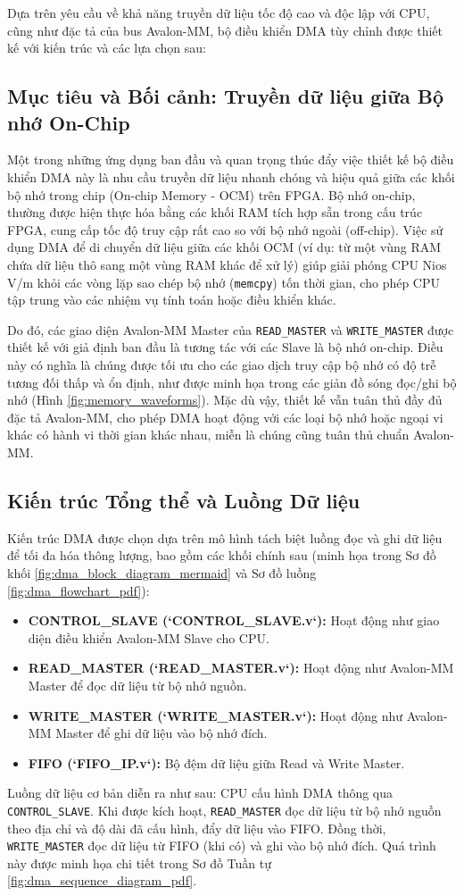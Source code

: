 Dựa trên yêu cầu về khả năng truyền dữ liệu tốc độ cao và độc lập với CPU, cũng như đặc tả của bus Avalon-MM, bộ điều khiển DMA tùy chỉnh được thiết kế với kiến trúc và các lựa chọn sau:

\subsection{Mục tiêu và Bối cảnh: Truyền dữ liệu giữa Bộ nhớ On-Chip}
\label{subsec:dma_context_onchip}
Một trong những ứng dụng ban đầu và quan trọng thúc đẩy việc thiết kế bộ điều khiển DMA này là nhu cầu truyền dữ liệu nhanh chóng và hiệu quả giữa các khối bộ nhớ trong chip (On-chip Memory - OCM) trên FPGA. Bộ nhớ on-chip, thường được hiện thực hóa bằng các khối RAM tích hợp sẵn trong cấu trúc FPGA, cung cấp tốc độ truy cập rất cao so với bộ nhớ ngoài (off-chip). Việc sử dụng DMA để di chuyển dữ liệu giữa các khối OCM (ví dụ: từ một vùng RAM chứa dữ liệu thô sang một vùng RAM khác để xử lý) giúp giải phóng CPU Nios V/m khỏi các vòng lặp sao chép bộ nhớ (\texttt{memcpy}) tốn thời gian, cho phép CPU tập trung vào các nhiệm vụ tính toán hoặc điều khiển khác.

Do đó, các giao diện Avalon-MM Master của \texttt{READ\_MASTER} và \texttt{WRITE\_MASTER} được thiết kế với giả định ban đầu là tương tác với các Slave là bộ nhớ on-chip. Điều này có nghĩa là chúng được tối ưu cho các giao dịch truy cập bộ nhớ có độ trễ tương đối thấp và ổn định, như được minh họa trong các giản đồ sóng đọc/ghi bộ nhớ (Hình \ref{fig:memory_waveforms}). Mặc dù vậy, thiết kế vẫn tuân thủ đầy đủ đặc tả Avalon-MM, cho phép DMA hoạt động với các loại bộ nhớ hoặc ngoại vi khác có hành vi thời gian khác nhau, miễn là chúng cũng tuân thủ chuẩn Avalon-MM.

\subsection{Kiến trúc Tổng thể và Luồng Dữ liệu}
Kiến trúc DMA được chọn dựa trên mô hình tách biệt luồng đọc và ghi dữ liệu để tối đa hóa thông lượng, bao gồm các khối chính sau (minh họa trong Sơ đồ khối \ref{fig:dma_block_diagram_mermaid} và Sơ đồ luồng \ref{fig:dma_flowchart_pdf}):
\begin{itemize}
    \item \textbf{CONTROL\_SLAVE (`CONTROL\_SLAVE.v`):} Hoạt động như giao diện điều khiển Avalon-MM Slave cho CPU.
    \item \textbf{READ\_MASTER (`READ\_MASTER.v`):} Hoạt động như Avalon-MM Master để đọc dữ liệu từ bộ nhớ nguồn.
    \item \textbf{WRITE\_MASTER (`WRITE\_MASTER.v`):} Hoạt động như Avalon-MM Master để ghi dữ liệu vào bộ nhớ đích.
    \item \textbf{FIFO (`FIFO\_IP.v`):} Bộ đệm dữ liệu giữa Read và Write Master.
\end{itemize}
Luồng dữ liệu cơ bản diễn ra như sau: CPU cấu hình DMA thông qua \texttt{CONTROL\_SLAVE}. Khi được kích hoạt, \texttt{READ\_MASTER} đọc dữ liệu từ bộ nhớ nguồn theo địa chỉ và độ dài đã cấu hình, đẩy dữ liệu vào FIFO. Đồng thời, \texttt{WRITE\_MASTER} đọc dữ liệu từ FIFO (khi có) và ghi vào bộ nhớ đích. Quá trình này được minh họa chi tiết trong Sơ đồ Tuần tự \ref{fig:dma_sequence_diagram_pdf}.

